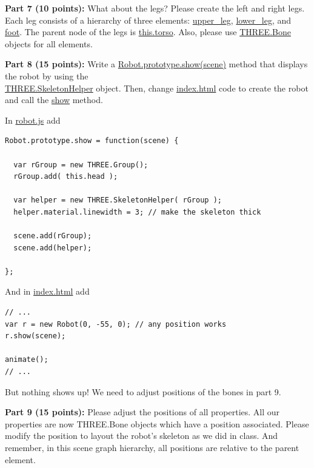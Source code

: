 \documentclass[10pt,oneside,onecolumn,letterpaper]{article}
\begin{document}
\vspace{.5cm}

\noindent\textbf{Part 7 (10 points):} What about the legs? Please create the left and right legs. Each leg consists of a hierarchy of three elements: \url{upper_leg}, \url{lower_leg}, and \url{foot}. The parent node of the legs is \url{this.torso}. Also, please use \url{THREE.Bone} objects for all elements.

\vspace{.5cm}

\noindent\textbf{Part 8 (15 points):} Write a \url{Robot.prototype.show(scene)} method that displays the robot by using the\\ \url{THREE.SkeletonHelper} object. Then, change  \url{index.html} code to create the robot and call the \url{show} method.

\vspace{.5cm}

\noindent In \url{robot.js} add

\begin{verbatim}
Robot.prototype.show = function(scene) {

  var rGroup = new THREE.Group();
  rGroup.add( this.head );

  var helper = new THREE.SkeletonHelper( rGroup );
  helper.material.linewidth = 3; // make the skeleton thick

  scene.add(rGroup);
  scene.add(helper);

};
\end{verbatim}

\noindent And in \url{index.html} add

\begin{verbatim}
// ...
var r = new Robot(0, -55, 0); // any position works
r.show(scene);

animate();
// ...
\end{verbatim}

\noindent But nothing shows up! We need to adjust positions of the bones in part 9.

\vspace{.5cm}

\noindent\textbf{Part 9 (15 points):} Please adjust the positions of all properties. All our properties are now THREE.Bone objects which have a position associated. Please modify the position to layout the robot's skeleton as we did in class. And remember, in this scene graph hierarchy, all positions are relative to the parent element.

\vspace{.5cm}
\end{document}
